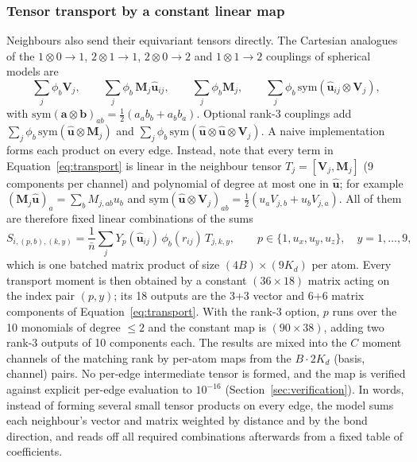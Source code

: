 \documentclass[journal=jctcce,manuscript=article,layout=traditional]{achemso}
\newcommand{\vect}[1]{\bm{#1}}
\begin{document}
\subsubsection{Tensor transport by a constant linear map}
\label{sec:transport}
Neighbours also send their equivariant tensors directly. The Cartesian analogues of the
$1\otimes0\to1$, $2\otimes1\to1$, $2\otimes0\to2$ and $1\otimes1\to2$ couplings of spherical models are
\begin{equation}
\sum_j\phi_b\vect V_j,\qquad \sum_j\phi_b\,\vect M_j\hat{\vect u}_{ij},\qquad \sum_j\phi_b\vect M_j,\qquad
\sum_j\phi_b\,\mathrm{sym}(\hat{\vect u}_{ij}\otimes\vect V_j),
\label{eq:transport}
\end{equation}
with $\mathrm{sym}(\vect a\otimes\vect b)_{ab}=\tfrac12(a_ab_b+a_bb_a)$. Optional rank-3 couplings add
$\sum_j\phi_b\,\mathrm{sym}(\hat{\vect u}\otimes\vect M_j)$ and
$\sum_j\phi_b\,\mathrm{sym}(\hat{\vect u}\otimes\hat{\vect u}\otimes\vect V_j)$. A naive implementation forms each
product on every edge. Instead, note that every term in Equation~\ref{eq:transport} is linear in the neighbour tensor
$T_j=[\vect V_j,\vect M_j]$ (9 components per channel) and polynomial of degree at most one in
$\hat{\vect u}$; for example $(\vect M_j\hat{\vect u})_a=\sum_{b}M_{j,ab}u_b$ and
$\mathrm{sym}(\hat{\vect u}\otimes\vect V_j)_{ab}=\tfrac12(u_aV_{j,b}+u_bV_{j,a})$. All of them are therefore fixed
linear combinations of the sums
\begin{equation}
S_{i,(p,b),(k,y)}=\frac{1}{\bar n}\sum_j Y_p(\hat{\vect u}_{ij})\,\phi_b(r_{ij})\,T_{j,k,y},\qquad
p\in\{1,u_x,u_y,u_z\},\quad y=1,\dots,9,
\label{eq:transportS}
\end{equation}
which is one batched matrix product of size $(4B)\times(9K_d)$ per atom. Every transport moment is then obtained by
a constant $(36\times18)$ matrix acting on the index pair $(p,y)$; its 18 outputs are the 3+3 vector and 6+6
matrix components of Equation~\ref{eq:transport}. With the rank-3 option, $p$ runs over the 10 monomials of degree
$\le2$ and the constant map is $(90\times38)$, adding two rank-3 outputs of 10 components each. The results are
mixed into the $C$ moment channels of the matching rank by per-atom maps from the $B\cdot2K_d$ (basis, channel)
pairs. No per-edge intermediate tensor is formed, and the map is verified against explicit per-edge evaluation to
$10^{-16}$ (Section~\ref{sec:verification}). In words, instead of forming several small tensor products on every
edge, the model sums each neighbour's vector and matrix weighted by distance and by the bond direction, and reads off
all required combinations afterwards from a fixed table of coefficients.
\end{document}
